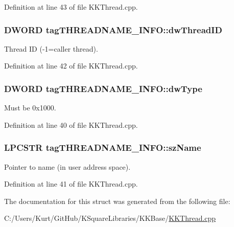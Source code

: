 Definition at line 43 of file K\+K\+Thread.\+cpp.

\subsubsection[{\texorpdfstring{dw\+Thread\+ID}{dwThreadID}}]{\setlength{\rightskip}{0pt plus 5cm}D\+W\+O\+RD tag\+T\+H\+R\+E\+A\+D\+N\+A\+M\+E\+\_\+\+I\+N\+F\+O\+::dw\+Thread\+ID}\hypertarget{structtag_t_h_r_e_a_d_n_a_m_e___i_n_f_o_a24718e7417e1e20715b29d4f1a0be68f}{}\label{structtag_t_h_r_e_a_d_n_a_m_e___i_n_f_o_a24718e7417e1e20715b29d4f1a0be68f}
Thread ID (-\/1=caller thread). 

Definition at line 42 of file K\+K\+Thread.\+cpp.

\subsubsection[{\texorpdfstring{dw\+Type}{dwType}}]{\setlength{\rightskip}{0pt plus 5cm}D\+W\+O\+RD tag\+T\+H\+R\+E\+A\+D\+N\+A\+M\+E\+\_\+\+I\+N\+F\+O\+::dw\+Type}\hypertarget{structtag_t_h_r_e_a_d_n_a_m_e___i_n_f_o_ae02b6e443275505c76334349917ac19a}{}\label{structtag_t_h_r_e_a_d_n_a_m_e___i_n_f_o_ae02b6e443275505c76334349917ac19a}
Must be 0x1000. 

Definition at line 40 of file K\+K\+Thread.\+cpp.

\subsubsection[{\texorpdfstring{sz\+Name}{szName}}]{\setlength{\rightskip}{0pt plus 5cm}L\+P\+C\+S\+TR tag\+T\+H\+R\+E\+A\+D\+N\+A\+M\+E\+\_\+\+I\+N\+F\+O\+::sz\+Name}\hypertarget{structtag_t_h_r_e_a_d_n_a_m_e___i_n_f_o_ad053e3f32a5793f307875286fd9e7afc}{}\label{structtag_t_h_r_e_a_d_n_a_m_e___i_n_f_o_ad053e3f32a5793f307875286fd9e7afc}
Pointer to name (in user address space). 

Definition at line 41 of file K\+K\+Thread.\+cpp.



The documentation for this struct was generated from the following file\+:\begin{DoxyCompactItemize}
\item 
C\+:/\+Users/\+Kurt/\+Git\+Hub/\+K\+Square\+Libraries/\+K\+K\+Base/\hyperlink{_k_k_thread_8cpp}{K\+K\+Thread.\+cpp}\end{DoxyCompactItemize}
